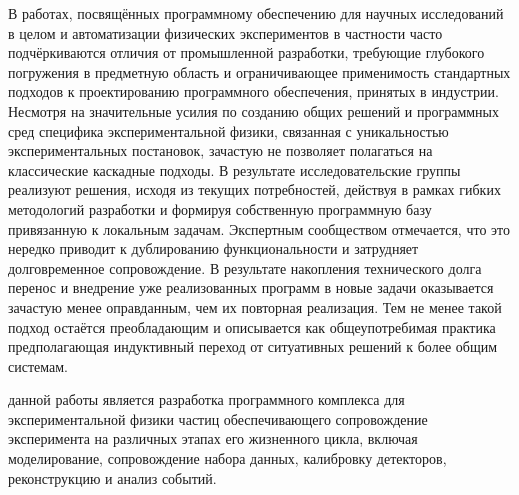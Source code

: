 {\progress} В работах, посвящённых программному обеспечению для научных исследований
в целом %
и автоматизации физических экспериментов в частности %
часто подчёркиваются отличия от промышленной разработки, требующие
глубокого погружения в предметную область и ограничивающее применимость
стандартных подходов к проектированию программного обеспечения, принятых в
индустрии. Несмотря на значительные усилия по созданию общих решений
и программных сред %
специфика экспериментальной физики, связанная с
уникальностью экспериментальных постановок,
зачастую не позволяет полагаться на классические %
каскадные подходы.
В результате исследовательские группы реализуют решения, исходя
из текущих потребностей, действуя в рамках
гибких методологий разработки и формируя собственную программную базу
привязанную к локальным задачам. Экспертным сообществом отмечается,
что это нередко приводит к дублированию функциональности и затрудняет
долговременное сопровождение. %
В результате накопления технического долга перенос и внедрение
уже реализованных программ в новые
задачи оказывается зачастую менее оправданным, чем их повторная
реализация.
Тем не менее такой подход остаётся преобладающим и описывается
как общеупотребимая практика %
предполагающая индуктивный переход от ситуативных решений
к более общим системам.

{\aim} данной работы является разработка программного комплекса для
экспериментальной физики частиц обеспечивающего сопровождение
эксперимента на различных этапах его жизненного цикла, включая
моделирование, сопровождение набора данных, калибровку детекторов,
реконструкцию и анализ событий.

